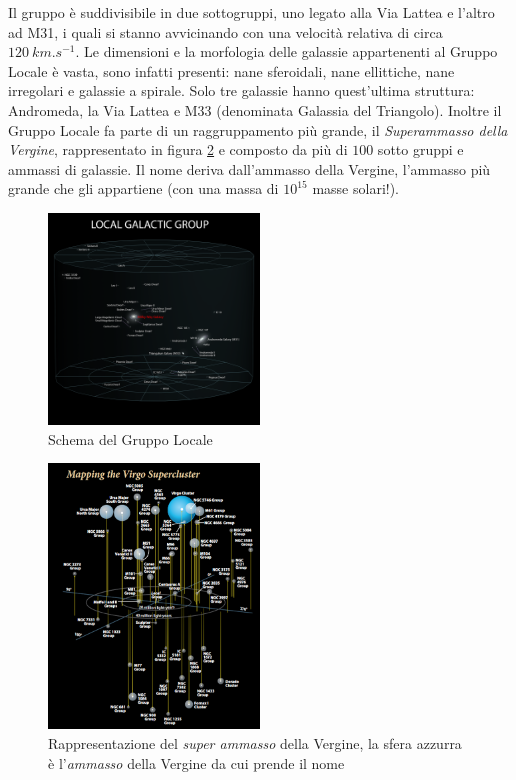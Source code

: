 \noindent Il gruppo è suddivisibile in due sottogruppi, uno legato alla Via Lattea e l’altro ad M31, i quali si stanno avvicinando con una velocità relativa di circa $\SI{120}{km.s^{-1}}$.
Le dimensioni e la morfologia delle galassie appartenenti al Gruppo Locale è vasta, sono infatti presenti: nane sferoidali, nane ellittiche, nane irregolari e galassie a spirale. Solo tre galassie hanno quest’ultima struttura: Andromeda, la Via Lattea e M33 (denominata Galassia del Triangolo).
Inoltre il Gruppo Locale fa parte di un raggruppamento più grande, il \emph{Superammasso della Vergine}, rappresentato in figura \ref{fig:virgo-cluster} e composto da più di $100$ sotto gruppi e ammassi di galassie. Il nome deriva dall’ammasso della Vergine, l'ammasso più grande che gli appartiene (con una massa di $10^{15}$ masse solari!).
\begin{figure}
    \centering
    \includegraphics[width = 0.5\textwidth]{immagini/Gruppo-Locale.png}
    \caption{Schema del Gruppo Locale}
    \label{fig:gruppo-locale}
\end{figure}
\begin{figure}
    \centering
    \includegraphics[width = 0.5\textwidth]{immagini/virgo-cluster.png}
    \caption{Rappresentazione del \emph{super ammasso} della Vergine, la sfera azzurra è l'\emph{ammasso} della Vergine da cui prende il nome}
    \label{fig:virgo-cluster}
\end{figure}
